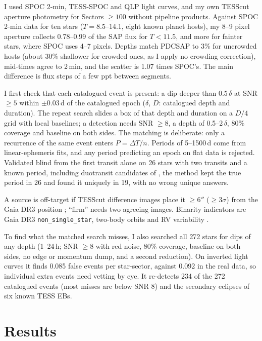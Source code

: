 \documentclass{aastex701}
\begin{document}
I used SPOC 2-min, TESS-SPOC \citep{Caldwell2020} and QLP \citep{Huang2020} light curves, and my own
TESScut aperture photometry \citep{Brasseur2019} for Sectors $\geq100$ without pipeline products.
Against SPOC 2-min data for ten stars ($T=8.5$--14.1, eight known planet hosts), my 8--9 pixel
aperture collects 0.78--0.99 of the SAP flux for $T<11.5$, and more for fainter stars, where SPOC
uses 4--7 pixels. Depths match PDCSAP to 3\% for uncrowded hosts (about 30\% shallower for crowded
ones, as I apply no crowding correction), mid-times agree to 2\,min, and the scatter is 1.07 times
SPOC's. The main difference is flux steps of a few ppt between segments.

I first check that each catalogued event is present: a dip deeper than $0.5\,\delta$ at SNR $\geq5$ within
$\pm0.03$\,d of the catalogued epoch ($\delta$, $D$: catalogued depth and duration). The repeat
search slides a box of that depth and duration on a $D/4$ grid with local baselines; a detection
needs SNR $\geq8$, a depth of 0.5--2$\,\delta$, 80\% coverage and baseline on both sides. The
matching is deliberate: only a recurrence of the same event enters $P=\Delta T/n$. Periods of
5--1500\,d come from linear-ephemeris fits, and any period predicting an epoch on flat data is
rejected. Validated blind from the first transit alone on 26 stars with two transits and a known
period, including duotransit candidates of \citet{Hawthorn2024}, the method kept the true period in
26 and found it uniquely in 19, with no wrong unique answers.

A source is off-target if TESScut difference images place it $\geq6''$ ($\geq3\sigma$) from the Gaia
DR3 position \citep{Gaia2023}; ``firm'' needs two agreeing images. Binarity indicators are Gaia DR3
\texttt{non\_single\_star}, two-body orbits and RV variability \citep[$p\leq0.01$, renormalised GOF
$>4$;][]{Katz2023}.

To find what the matched search misses, I also searched all 272 stars for dips of any depth
(1--24\,h; SNR $\geq8$ with red noise, 80\% coverage, baseline on both sides, no edge or momentum
dump, and a second reduction). On inverted light curves it finds 0.085 false events per
star-sector, against 0.092 in the real data, so individual extra events need vetting by eye. It
re-detects 234 of the 272 catalogued events (most misses are below SNR 8) and the secondary eclipses
of six known TESS EBs.

\section{Results}
\end{document}
